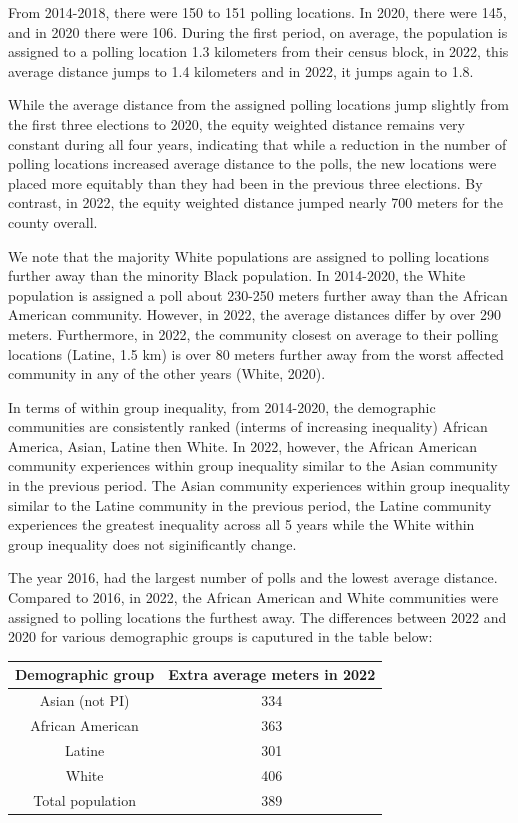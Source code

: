 \documentclass[11pt]{article}
\theoremstyle{remark}
\theoremstyle{definition}
\begin{document}
From 2014-2018, there were 150 to 151 polling locations. In 2020, there were 145, and in 2020 there were 106. During the first period, on average, the population is assigned to a polling location 1.3 kilometers from their census block, in 2022, this average distance jumps to 1.4 kilometers and in 2022, it jumps again to 1.8.

While the average distance from the assigned polling locations jump slightly from the first three elections to 2020, the equity weighted distance remains very constant during all four years, indicating that while a reduction in the number of polling locations increased average distance to the polls, the new locations were placed more equitably than they had been in the previous three elections. By contrast, in 2022, the equity weighted distance jumped nearly 700 meters for the county overall. 

We note that the majority White populations are assigned to polling locations further away than the minority Black population. In 2014-2020, the White population is assigned a poll about 230-250 meters further away than the African American community. However, in 2022, the average distances differ by over 290 meters. Furthermore, in 2022, the community closest on average to their polling locations (Latine, 1.5 km) is over 80 meters further away from the worst affected community in any of the other years (White, 2020).

In terms of within group inequality, from 2014-2020, the demographic communities are consistently ranked (interms of increasing inequality) African America, Asian, Latine then White. In 2022, however, the African American community experiences within group inequality similar to the Asian community in the previous period. The Asian community experiences within group inequality similar to the Latine community in the previous period, the Latine community experiences the greatest inequality across all 5 years while the White within group inequality does not siginificantly change. 

The year 2016, had the largest number of polls and the lowest average distance. Compared to 2016, in 2022, the African American and White communities were assigned to polling locations the furthest away. The differences between 2022 and 2020 for various demographic groups is caputured in the table below:

\begin{tabular}{|c|c|}
	\hline
	Demographic group & Extra average meters in 2022 \\ \hline
	Asian (not PI) &   334 \\ \hline
	African American &   363  \\ \hline
	Latine & 301 \\ \hline
	White &  406\\ \hline
	Total population &  389\\ \hline
\end{tabular}
\end{document}
